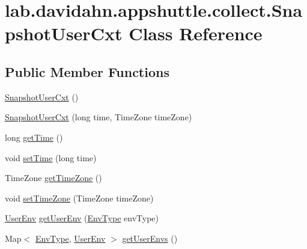 \hypertarget{classlab_1_1davidahn_1_1appshuttle_1_1collect_1_1_snapshot_user_cxt}{\section{lab.\-davidahn.\-appshuttle.\-collect.\-Snapshot\-User\-Cxt \-Class \-Reference}
\label{classlab_1_1davidahn_1_1appshuttle_1_1collect_1_1_snapshot_user_cxt}
}
\subsection*{\-Public \-Member \-Functions}
\begin{DoxyCompactItemize}
\item 
\hyperlink{classlab_1_1davidahn_1_1appshuttle_1_1collect_1_1_snapshot_user_cxt_ac7c4537af745a94975f644bc6e850219}{\-Snapshot\-User\-Cxt} ()
\item 
\hyperlink{classlab_1_1davidahn_1_1appshuttle_1_1collect_1_1_snapshot_user_cxt_afee1b89b77b5f3a21df5d1166b2cd1b8}{\-Snapshot\-User\-Cxt} (long time, \-Time\-Zone time\-Zone)
\item 
long \hyperlink{classlab_1_1davidahn_1_1appshuttle_1_1collect_1_1_snapshot_user_cxt_a0641846d7e2540996053bbde0e797976}{get\-Time} ()
\item 
void \hyperlink{classlab_1_1davidahn_1_1appshuttle_1_1collect_1_1_snapshot_user_cxt_ad66f949d2a77c6f3a4400d132f7353b3}{set\-Time} (long time)
\item 
\-Time\-Zone \hyperlink{classlab_1_1davidahn_1_1appshuttle_1_1collect_1_1_snapshot_user_cxt_a65620c3ef88efde0f0c57c6d9fba97be}{get\-Time\-Zone} ()
\item 
void \hyperlink{classlab_1_1davidahn_1_1appshuttle_1_1collect_1_1_snapshot_user_cxt_a740f73aedb92b78649f47d0aecd756e6}{set\-Time\-Zone} (\-Time\-Zone time\-Zone)
\item 
\hyperlink{classlab_1_1davidahn_1_1appshuttle_1_1collect_1_1env_1_1_user_env}{\-User\-Env} \hyperlink{classlab_1_1davidahn_1_1appshuttle_1_1collect_1_1_snapshot_user_cxt_a12d1d092400c17366cafba6ede4db47d}{get\-User\-Env} (\hyperlink{enumlab_1_1davidahn_1_1appshuttle_1_1collect_1_1env_1_1_env_type}{\-Env\-Type} env\-Type)
\item 
\-Map$<$ \hyperlink{enumlab_1_1davidahn_1_1appshuttle_1_1collect_1_1env_1_1_env_type}{\-Env\-Type}, \hyperlink{classlab_1_1davidahn_1_1appshuttle_1_1collect_1_1env_1_1_user_env}{\-User\-Env} $>$ \hyperlink{classlab_1_1davidahn_1_1appshuttle_1_1collect_1_1_snapshot_user_cxt_a7732017a3c377fce3ff617983d1df6e3}{get\-User\-Envs} ()

\end{DoxyCompactItemize}
